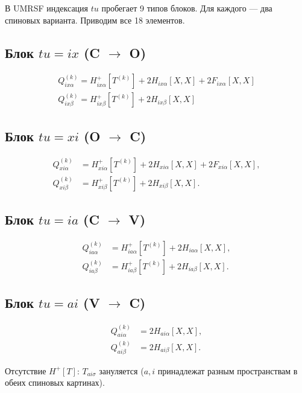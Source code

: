 \documentclass[11pt, a4paper]{article}
\theoremstyle{definition}
\newcommand{\Tk}[2]{T^{(#1)}_{#2}}
\newcommand{\Hp}{H^{+}}
\begin{document}
В UMRSF индексация $tu$ пробегает 9 типов блоков. Для каждого --- два спиновых варианта. Приводим все 18 элементов.

\subsection{Блок $tu = ix$ (C $\to$ O)}

\begin{align}
    \boxed{Q^{(k)}_{ix\alpha} = \Hp_{ix\alpha}[\Tk{k}{}] + 2 H_{ix\alpha}[X, X] + 2 F_{ix\alpha}[X, X]} \label{eq:Qixa} \\
    \boxed{Q^{(k)}_{ix\beta} = \Hp_{ix\beta}[\Tk{k}{}] + 2 H_{ix\beta}[X, X]} \label{eq:Qixb}
\end{align}

\subsection{Блок $tu = xi$ (O $\to$ C)}

\begin{align}
    Q^{(k)}_{xi\alpha} &= \Hp_{xi\alpha}[\Tk{k}{}] + 2 H_{xi\alpha}[X, X] + 2 F_{xi\alpha}[X, X], \\
    Q^{(k)}_{xi\beta} &= \Hp_{xi\beta}[\Tk{k}{}] + 2 H_{xi\beta}[X, X].
\end{align}

\subsection{Блок $tu = ia$ (C $\to$ V)}

\begin{align}
    Q^{(k)}_{ia\alpha} &= \Hp_{ia\alpha}[\Tk{k}{}] + 2 H_{ia\alpha}[X, X], \\
    Q^{(k)}_{ia\beta} &= \Hp_{ia\beta}[\Tk{k}{}] + 2 H_{ia\beta}[X, X].
\end{align}

\subsection{Блок $tu = ai$ (V $\to$ C)}

\begin{align}
    Q^{(k)}_{ai\alpha} &= 2 H_{ai\alpha}[X, X], \\
    Q^{(k)}_{ai\beta} &= 2 H_{ai\beta}[X, X].
\end{align}

Отсутствие $\Hp[T]$: $T_{ai\sigma}$ зануляется ($a, i$ принадлежат разным пространствам в обеих спиновых картинах).
\end{document}
